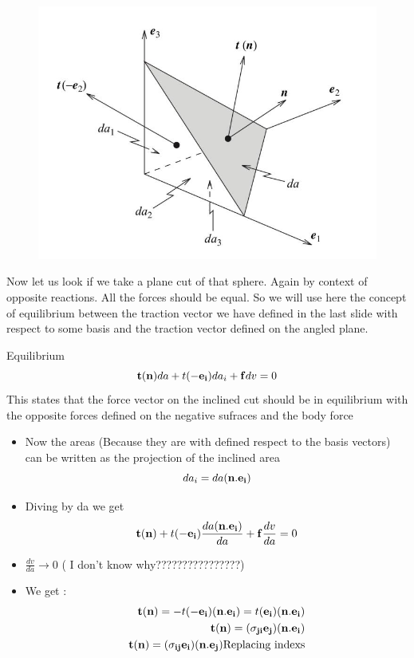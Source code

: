 	\begin{frame}
		\begin{figure}
			\centering
			\includegraphics[width=0.5\linewidth]{Figure/fig9}
		\end{figure}
		
		Now let us look if we take a plane cut of that sphere. Again by context of opposite reactions. All the forces should be equal. So we will use here the concept of equilibrium between the traction vector we have defined in the last slide with respect to some basis and the traction vector defined on the angled plane.
		
		\begin{block}{Equilibrium}
			\begin{equation}
			\mathbf{t(n)}da + t(\mathbf{-e_i})da_i + \mathbf{f}dv = 0
			\end{equation}
			This states that the force vector on the inclined cut should be in equilibrium with the opposite forces defined on the negative sufraces and the body force
		\end{block}
	
	\end{frame}

	\begin{frame}
		\begin{itemize}
			\item  Now the areas (Because they are with defined respect to the basis vectors) can be written as the projection of the inclined area
			\begin{equation}
				da_i = da(\mathbf{n.e_i})
			\end{equation}
			\item Diving by da we get 
			\begin{equation}
			\mathbf{t(n)} + t(\mathbf{-e_i})\frac{da(\mathbf{n.e_i})}{da} + \mathbf{f}\frac{dv}{da} = 0
			\end{equation}
			\item $\frac{dv}{da} \rightarrow 0$  ( I don't know why????????????????)
			\item We get :
			\begin{equation}
			\begin{aligned}
			\mathbf{t(n)} = - t(\mathbf{-e_i})(\mathbf{n.e_i}) =  t(\mathbf{e_i})(\mathbf{n.e_i})\\
			\mathbf{t(n)} = (\mathbf{\sigma_{ji}e_j})(\mathbf{n.e_i}) \\
			\mathbf{t(n)} = (\mathbf{\sigma_{ij}e_i})(\mathbf{n.e_j}) \text{Replacing indexs}\\
			\end{aligned}
			\end{equation}
		\end{itemize}
	\end{frame}


